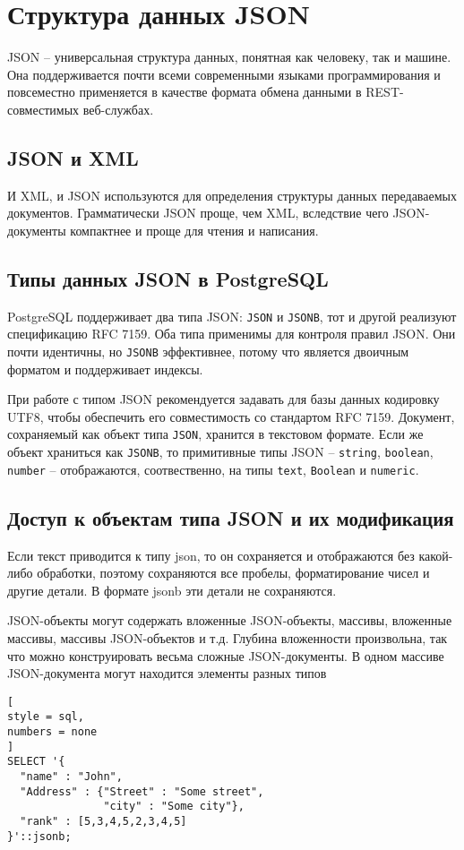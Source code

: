 \documentclass[%
	11pt,
	a4paper,
	utf8,
		]{article}
\begin{document}
\section{Структура данных JSON}

JSON -- универсальная структура данных, понятная как человеку, так и машине. Она поддерживается почти всеми современными языками программирования и повсеместно применяется в качестве формата обмена данными в REST-совместимых веб-службах.

\subsection{JSON и XML}

И XML, и JSON используются для определения структуры данных передаваемых документов. Грамматически JSON проще, чем XML, вследствие чего JSON-документы компактнее и проще для чтения и написания. 

\subsection{Типы данных JSON в PostgreSQL}

PostgreSQL поддерживает два типа JSON: \texttt{JSON} и \texttt{JSONB}, тот и другой реализуют спецификацию RFC 7159. Оба типа применимы для контроля правил JSON. Они почти идентичны, но \texttt{JSONB} эффективнее, потому что является двоичным форматом и поддерживает индексы.

При работе с типом JSON рекомендуется задавать для базы данных кодировку UTF8, чтобы обеспечить его совместимость со стандартом RFC 7159. Документ, сохраняемый как объект типа \texttt{JSON}, хранится в текстовом формате. Если же объект храниться как \texttt{JSONB}, то примитивные типы JSON -- \texttt{string}, \texttt{boolean}, \texttt{number} -- отображаются, соотвественно, на типы \texttt{text}, \texttt{Boolean} и \texttt{numeric}.

\subsection{Доступ к объектам типа JSON и их модификация}

Если текст приводится к типу json, то он сохраняется и отображаются без какой-либо обработки, поэтому сохраняются все пробелы, форматирование чисел и другие детали. В формате jsonb эти детали не сохраняются.

JSON-объекты могут содержать вложенные JSON-объекты, массивы, вложенные массивы, массивы JSON-объектов и т.д. Глубина вложенности произвольна, так что можно конструировать весьма сложные JSON-документы. В одном массиве JSON-документа могут находится элементы разных типов
\begin{lstlisting}[
style = sql,
numbers = none
]
SELECT '{
  "name" : "John",
  "Address" : {"Street" : "Some street",
               "city" : "Some city"},
  "rank" : [5,3,4,5,2,3,4,5]
}'::jsonb;
\end{lstlisting}
\end{document}
